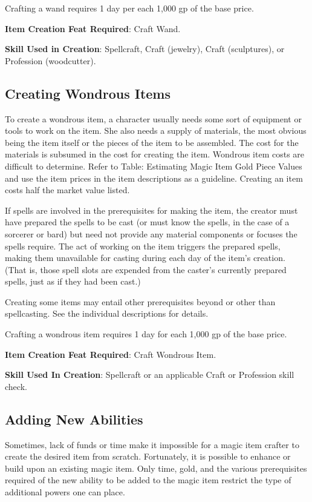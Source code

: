 Crafting a wand requires 1 day per each 1,000 gp of the base price.
				
\textbf{Item Creation Feat Required}: Craft Wand.
				
\textbf{Skill Used in Creation}: Spellcraft, Craft (jewelry), Craft (sculptures), or Profession (woodcutter).
				
\subsection{Creating Wondrous Items}

				
To create a wondrous item, a character usually needs some sort of equipment or tools to work on the item. She also needs a supply of materials, the most obvious being the item itself or the pieces of the item to be assembled. The cost for the materials is subsumed in the cost for creating the item. Wondrous item costs are difficult to determine. Refer to Table: Estimating Magic Item Gold Piece Values and use the item prices in the item descriptions as a guideline. Creating an item costs half the market value listed.
				
If spells are involved in the prerequisites for making the item, the creator must have prepared the spells to be cast (or must know the spells, in the case of a sorcerer or bard) but need not provide any material components or focuses the spells require. The act of working on the item triggers the prepared spells, making them unavailable for casting during each day of the item's creation. (That is, those spell slots are expended from the caster's currently prepared spells, just as if they had been cast.)
				
Creating some items may entail other prerequisites beyond or other than spellcasting. See the individual descriptions for details.
				
Crafting a wondrous item requires 1 day for each 1,000 gp of the base price.
				
\textbf{Item Creation Feat Required}: Craft Wondrous Item.
				
\textbf{Skill Used In Creation}: Spellcraft or an applicable Craft or Profession skill check.
				
\subsection{Adding New Abilities}

				
Sometimes, lack of funds or time make it impossible for a magic item crafter to create the desired item from scratch. Fortunately, it is possible to enhance or build upon an existing magic item. Only time, gold, and the various prerequisites required of the new ability to be added to the magic item restrict the type of additional powers one can place.
				
